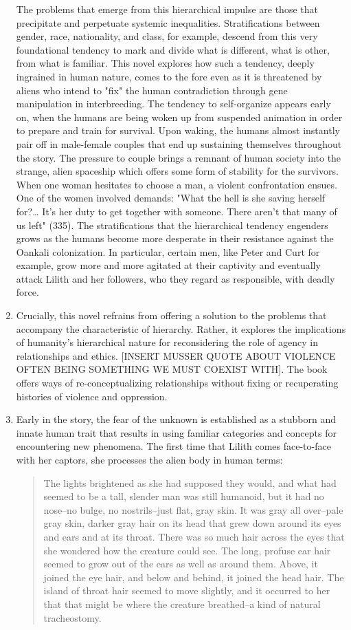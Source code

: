 \documentclass[11pt]{article}
\begin{document}
\begin{enumerate}
The problems that emerge from this hierarchical impulse are those that
precipitate and perpetuate systemic inequalities. Stratifications
between gender, race, nationality, and class, for example, descend
from this very foundational tendency to mark and divide what is
different, what is other, from what is familiar. This novel explores
how such a tendency, deeply ingrained in human nature, comes to the
fore even as it is threatened by aliens who intend to "fix" the human
contradiction through gene manipulation in interbreeding. The tendency
to self-organize appears early on, when the humans are being woken up
from suspended animation in order to prepare and train for
survival. Upon waking, the humans almost instantly pair off in
male-female couples that end up sustaining themselves throughout the
story. The pressure to couple brings a remnant of human society into
the strange, alien spaceship which offers some form of stability for
the survivors. When one woman hesitates to choose a man, a violent
confrontation ensues. One of the women involved demands: "What the
hell is she saving herself for?\ldots{} It's her duty to get together with
someone. There aren't that many of us left" (335). The stratifications
that the hierarchical tendency engenders grows as the humans become
more desperate in their resistance against the Oankali
colonization. In particular, certain men, like Peter and Curt for
example, grow more and more agitated at their captivity and eventually
attack Lilith and her followers, who they regard as responsible, with
deadly force. 

\item Crucially, this novel refrains from offering a solution to the
\label{sec:orge9bdbcb}
problems that accompany the characteristic of hierarchy. Rather, it
explores the implications of humanity's hierarchical nature for
reconsidering the role of agency in relationships and ethics. [INSERT
MUSSER QUOTE ABOUT VIOLENCE OFTEN BEING SOMETHING WE MUST COEXIST
WITH]. The book offers ways of re-conceptualizing relationships
without fixing or recuperating histories of violence and oppression.

\item Early in the story, the fear of the unknown is established as a
\label{sec:org9a65c76}
stubborn and innate human trait that results in using familiar
categories and concepts for encountering new phenomena. The first time
that Lilith comes face-to-face with her captors, she processes the
alien body in human terms:
\begin{quote}
The lights brightened as she had supposed they would, and what had
seemed to be a tall, slender man was still humanoid, but it had no
nose--no bulge, no nostrils--just flat, gray skin. It was gray all
over--pale gray skin, darker gray hair on its head that grew down
around its eyes and ears and at its throat. There was so much hair
across the eyes that she wondered how the creature could see. The
long, profuse ear hair seemed to grow out of the ears as well as
around them. Above, it joined the eye hair, and below and behind, it
joined the head hair. The island of throat hair seemed to move
slightly, and it occurred to her that that might be where the creature
breathed--a kind of natural tracheostomy.


\end{quote}
\end{enumerate}
\end{document}
